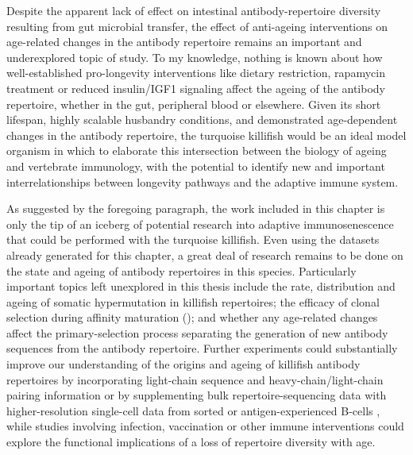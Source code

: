 Despite the apparent lack of effect on intestinal antibody-repertoire diversity resulting from gut microbial transfer, the effect of anti-ageing interventions on age-related changes in the antibody repertoire remains an important and underexplored topic of study. To my knowledge, nothing is known about how well-established pro-longevity interventions like dietary restriction, rapamycin treatment or reduced insulin/IGF1 signaling \parencite{lopezotin2013hallmarks} affect the ageing of the antibody repertoire, whether in the gut, peripheral blood or elsewhere. Given its short lifespan, highly scalable husbandry conditions, and demonstrated age-dependent changes in the antibody repertoire, the turquoise killifish would be an ideal model organism in which to elaborate this intersection between the biology of ageing and vertebrate immunology, with the potential to identify new and important interrelationships between longevity pathways and the adaptive immune system.

As suggested by the foregoing paragraph, the work included in this chapter is only the tip of an iceberg of potential research into adaptive immunosenescence that could be performed with the turquoise killifish. Even using the datasets already generated for this chapter, a great deal of research remains to be done on the state and ageing of antibody repertoires in this species. Particularly important topics left unexplored in this thesis include the rate, distribution and ageing of somatic hypermutation in killifish repertoires; the efficacy of clonal selection during affinity maturation (); and whether any age-related changes affect the primary-selection process separating the generation of new antibody sequences from the \naive antibody repertoire. Further experiments could substantially improve our understanding of the origins and ageing of killifish antibody repertoires by incorporating light-chain sequence and heavy-chain/light-chain pairing information or by supplementing bulk repertoire-sequencing data with higher-resolution single-cell data from sorted \naive or antigen-experienced B-cells \parencite{friedensohn2017advanced}, while studies involving infection, vaccination or other immune interventions could explore the functional implications of a loss of repertoire diversity with age.

